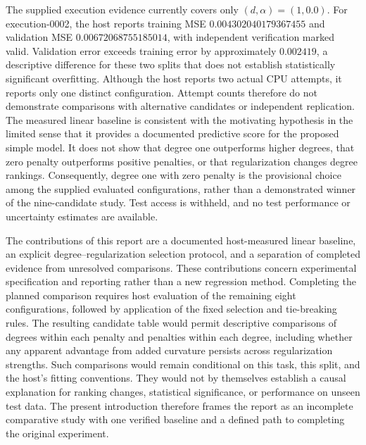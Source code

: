\documentclass[11pt]{article}
\begin{document}
The supplied execution evidence currently covers only \((d,\alpha)=(1,0.0)\). For execution-0002, the host reports training MSE \(0.004302040179367455\) and validation MSE \(0.00672068755185014\), with independent verification marked valid. Validation error exceeds training error by approximately \(0.002419\), a descriptive difference for these two splits that does not establish statistically significant overfitting. Although the host reports two actual CPU attempts, it reports only one distinct configuration. Attempt counts therefore do not demonstrate comparisons with alternative candidates or independent replication. The measured linear baseline is consistent with the motivating hypothesis in the limited sense that it provides a documented predictive score for the proposed simple model. It does not show that degree one outperforms higher degrees, that zero penalty outperforms positive penalties, or that regularization changes degree rankings. Consequently, degree one with zero penalty is the provisional choice among the supplied evaluated configurations, rather than a demonstrated winner of the nine-candidate study. Test access is withheld, and no test performance or uncertainty estimates are available.

The contributions of this report are a documented host-measured linear baseline, an explicit degree--regularization selection protocol, and a separation of completed evidence from unresolved comparisons. These contributions concern experimental specification and reporting rather than a new regression method. Completing the planned comparison requires host evaluation of the remaining eight configurations, followed by application of the fixed selection and tie-breaking rules. The resulting candidate table would permit descriptive comparisons of degrees within each penalty and penalties within each degree, including whether any apparent advantage from added curvature persists across regularization strengths. Such comparisons would remain conditional on this task, this split, and the host's fitting conventions. They would not by themselves establish a causal explanation for ranking changes, statistical significance, or performance on unseen test data. The present introduction therefore frames the report as an incomplete comparative study with one verified baseline and a defined path to completing the original experiment.
\end{document}
